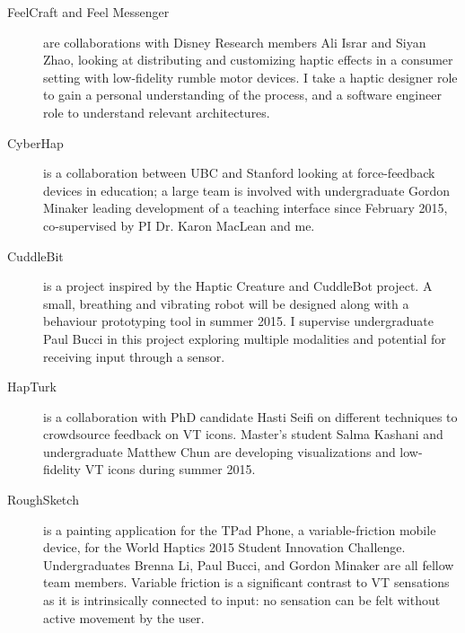 \begin{description}
	\item[FeelCraft and Feel Messenger] are collaborations with Disney Research members Ali Israr and Siyan Zhao, looking at distributing and customizing haptic effects in a consumer setting with low-fidelity rumble motor devices.
	I take a haptic designer role to gain a personal understanding of the process, and a software engineer role to understand relevant architectures. %

	\item[CyberHap] is a collaboration between UBC and Stanford looking at force-feedback devices in education; a large team is involved with undergraduate Gordon Minaker leading development of a teaching interface since February 2015, co-supervised by PI Dr. Karon MacLean and me.
	
	\item[CuddleBit] is a project inspired by the Haptic Creature and CuddleBot project. A small, breathing and vibrating robot will be designed along with a behaviour prototyping tool in summer 2015.
	I supervise undergraduate Paul Bucci in this project exploring multiple modalities and potential for receiving input through a sensor.

	\item[HapTurk] is a collaboration with PhD candidate Hasti Seifi on different techniques to crowdsource feedback on VT icons. Master's student Salma Kashani and undergraduate Matthew Chun are developing visualizations and low-fidelity VT icons during summer 2015.

	\item[RoughSketch] is a painting application for the TPad Phone, a variable-friction mobile device, for the World Haptics 2015 Student Innovation Challenge. Undergraduates Brenna Li, Paul Bucci, and Gordon Minaker are all fellow team members. Variable friction is a significant contrast to VT sensations as it is intrinsically connected to input: no sensation can be felt without active movement by the user.
\end{description}



